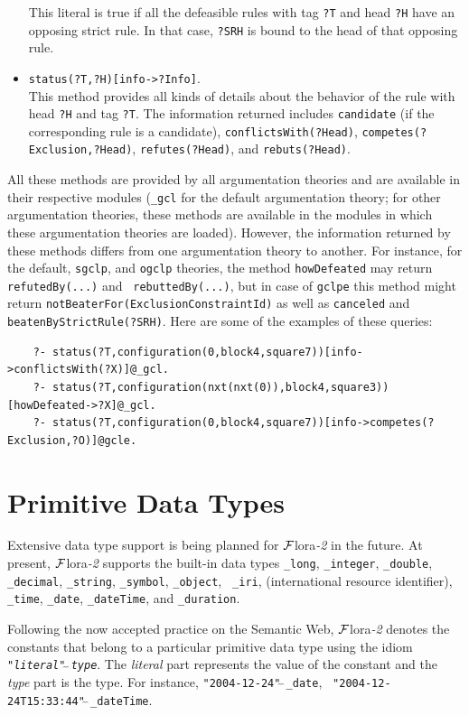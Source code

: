 \documentclass[11pt]{article}
\newcommand{\FLORA}{{\mbox{\sc ${\cal F}${lora}\rm\emph{-2}}}\xspace}
\begin{document}
\begin{itemize}
  This literal is true if all the defeasible rules with tag \texttt{?T}
  and head \texttt{?H} have an opposing strict rule. In that case,
  \texttt{?SRH} is bound to the head of that opposing rule. 
\item  {\tt status(?T,?H)[info->?Info]}.\\
  This method provides all kinds of details about the behavior of the rule
  with head {\tt ?H} and tag {\tt ?T}. The information returned
  includes {\tt candidate} (if the corresponding rule is a candidate),
  {\tt conflictsWith(?Head)}, \texttt{competes(?Exclusion,?Head)},
  {\tt refutes(?Head)}, and
  {\tt rebuts(?Head)}.   
\end{itemize}
All these methods are provided by all argumentation theories and are
available in their respective modules ({\tt \_gcl} for the default argumentation
theory; for other argumentation theories, these methods are available in
the modules in which these argumentation theories are loaded).
However,
the information returned by these methods differs from one argumentation theory
to another. For instance, for the default, \texttt{sgclp},
and {\tt ogclp} theories, the method
{\tt howDefeated} may return {\tt refutedBy(...)} and {\tt
  rebuttedBy(...)}, but in case of {\tt gclpe} this method might return
{\tt notBeaterFor(ExclusionConstraintId)} as well as \texttt{canceled} and
\texttt{beatenByStrictRule(?SRH)}.    
Here are some of the examples of these queries:
\begin{verbatim}
    ?- status(?T,configuration(0,block4,square7))[info->conflictsWith(?X)]@_gcl.
    ?- status(?T,configuration(nxt(nxt(0)),block4,square3))[howDefeated->?X]@_gcl.
    ?- status(?T,configuration(0,block4,square7))[info->competes(?Exclusion,?O)]@gcle.
\end{verbatim}


\section{Primitive Data Types}\label{sec-data-types}

Extensive data type support is being planned for \FLORA in the future.
At present, \FLORA supports the built-in data types
{\tt \_long}, \texttt{\_integer},
{\tt \_double},  \texttt{\_decimal},
\texttt{\_string}, {\tt \_symbol}, {\tt \_object}, {\tt
  \_iri}, (international resource identifier), {\tt \_time}, {\tt \_date},
{\tt \_dateTime}, and {\tt \_duration}.

Following the now accepted practice on the Semantic Web, \FLORA denotes the
constants that belong to a particular primitive data type using the idiom
{\tt "\emph{literal}"$\hat{~}\hat{~}$\emph{type}}. The \emph{literal} part
represents the value of the constant and the \emph{type} part is the
type. For instance, {\tt "2004-12-24"$\hat{~}\hat{~}$\_date}, {\tt
  "2004-12-24T15:33:44"$\hat{~}\hat{~}$\_dateTime}.
\end{document}
